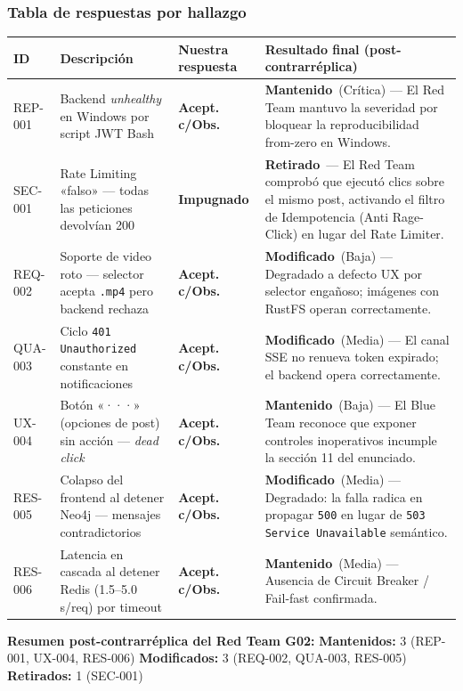 \documentclass[10pt,a4paper]{article}
\newcommand{\code}[1]{\nolinkurl{#1}}
\newcommand{\badgeMantenido}{\colorbox{red!15}{\textcolor{red!70!black}{\textbf{\footnotesize Mantenido}}}}
\newcommand{\badgeModificado}{\colorbox{yellow!30}{\textcolor{brown!80!black}{\textbf{\footnotesize Modificado}}}}
\newcommand{\badgeRetirado}{\colorbox{green!20}{\textcolor{green!60!black}{\textbf{\footnotesize Retirado}}}}
\newcommand{\badgeAceptadoObs}{\colorbox{yellow!30}{\textcolor{brown!80!black}{\textbf{\footnotesize Acept. c/Obs.}}}}
\newcommand{\badgeImpugnado}{\colorbox{red!15}{\textcolor{red!70!black}{\textbf{\footnotesize Impugnado}}}}
\begin{document}
\subsubsection{Tabla de respuestas por hallazgo}

\begin{tabularx}{\textwidth}{p{1.5cm} p{4.5cm} p{2.3cm} X}
\rowcolor{tableheader}\toprule
ID & Descripción & Nuestra respuesta & Resultado final (post-contrarréplica) \\ \midrule
REP-001 & Backend \textit{unhealthy} en Windows por script JWT Bash & \badgeAceptadoObs & \badgeMantenido\ (Crítica) — El Red Team mantuvo la severidad por bloquear la reproducibilidad from-zero en Windows. \\ \midrule
SEC-001 & Rate Limiting «falso» — todas las peticiones devolvían 200 & \badgeImpugnado & \badgeRetirado\ — El Red Team comprobó que ejecutó clics sobre el mismo post, activando el filtro de Idempotencia (Anti Rage-Click) en lugar del Rate Limiter. \\ \midrule
REQ-002 & Soporte de video roto — selector acepta \code{.mp4} pero backend rechaza & \badgeAceptadoObs & \badgeModificado\ (Baja) — Degradado a defecto UX por selector engañoso; imágenes con RustFS operan correctamente. \\ \midrule
QUA-003 & Ciclo \code{401 Unauthorized} constante en notificaciones & \badgeAceptadoObs & \badgeModificado\ (Media) — El canal SSE no renueva token expirado; el backend opera correctamente. \\ \midrule
UX-004 & Botón «···» (opciones de post) sin acción — \textit{dead click} & \badgeAceptadoObs & \badgeMantenido\ (Baja) — El Blue Team reconoce que exponer controles inoperativos incumple la sección 11 del enunciado. \\ \midrule
RES-005 & Colapso del frontend al detener Neo4j — mensajes contradictorios & \badgeAceptadoObs & \badgeModificado\ (Media) — Degradado: la falla radica en propagar \code{500} en lugar de \code{503 Service Unavailable} semántico. \\ \midrule
RES-006 & Latencia en cascada al detener Redis (1.5–5.0 s/req) por timeout & \badgeAceptadoObs & \badgeMantenido\ (Media) — Ausencia de Circuit Breaker / Fail-fast confirmada. \\ \bottomrule
\end{tabularx}

\vspace{0.5em}
\begin{tcolorbox}[colback=lightgray!50,colframe=upseblue!30,arc=2mm]
\small
\textbf{Resumen post-contrarréplica del Red Team G02:}\quad
\textbf{Mantenidos:} 3 (REP-001, UX-004, RES-006)\quad
\textbf{Modificados:} 3 (REQ-002, QUA-003, RES-005)\quad
\textbf{Retirados:} 1 (SEC-001)
\end{tcolorbox}
\end{document}

